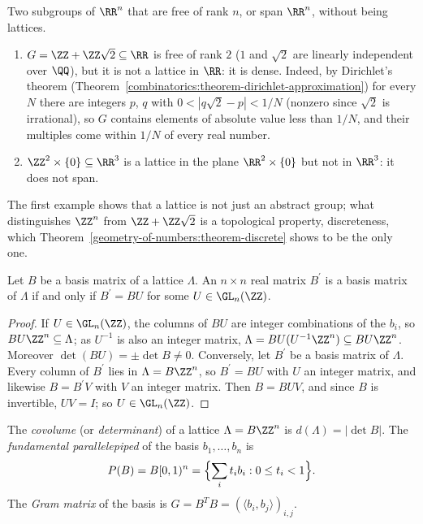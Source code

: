 \begin{counterexample}\label{geometry-of-numbers:counterexample-not-lattice}
Two subgroups of $\RR^n$ that are free of rank $n$, or span $\RR^n$, without being lattices.
\begin{enumerate}
\item $G = \ZZ + \ZZ\sqrt2 \subseteq \RR$ is free of rank $2$ ($1$ and $\sqrt2$ are linearly independent over $\QQ$), but it is not a lattice in $\RR$: it is dense. Indeed, by Dirichlet's
theorem (Theorem~\ref{combinatorics:theorem-dirichlet-approximation}) for every $N$ there are integers $p$, $q$ with $0 < |q\sqrt2 - p| < 1/N$ (nonzero since $\sqrt2$ is irrational), so $G$ contains
elements of absolute value less than $1/N$, and their multiples come within $1/N$ of every real number.
\item $\ZZ^2 \times \{0\} \subseteq \RR^3$ is a lattice in the plane $\RR^2 \times \{0\}$ but not in $\RR^3$: it does not span.
\end{enumerate}
The first example shows that a lattice is not just an abstract group; what distinguishes $\ZZ^n$ from $\ZZ + \ZZ\sqrt2$ is a topological property, discreteness, which
Theorem~\ref{geometry-of-numbers:theorem-discrete} shows to be the only one.
\end{counterexample}

\begin{proposition}\label{geometry-of-numbers:proposition-change-of-basis}
Let $B$ be a basis matrix of a lattice $\Lambda$. An $n \times n$ real matrix $B^{\prime}$ is a basis matrix of $\Lambda$ if and only if $B^{\prime} = BU$ for some $U \in \GL_n(\ZZ)$.
\end{proposition}

\begin{proof}
If $U \in \GL_n(\ZZ)$, the columns of $BU$ are integer combinations of the $b_i$, so $BU\ZZ^n \subseteq \Lambda$; as $U^{-1}$ is also an integer matrix, $\Lambda = BU(U^{-1}\ZZ^n) \subseteq BU\ZZ^n$.
Moreover $\det(BU) = \pm\det B \neq 0$. Conversely, let $B^{\prime}$ be a basis matrix of $\Lambda$. Every column of $B^{\prime}$ lies in $\Lambda = B\ZZ^n$, so $B^{\prime} = BU$ with $U$ an integer
matrix, and likewise $B = B^{\prime}V$ with $V$ an integer matrix. Then $B = BUV$, and since $B$ is invertible, $UV = I$; so $U \in \GL_n(\ZZ)$.
\end{proof}

\begin{definition}\label{geometry-of-numbers:definition-covolume}
The \emph{covolume} (or \emph{determinant}) of a lattice $\Lambda = B\ZZ^n$ is $d(\Lambda) = |\det B|$. The \emph{fundamental parallelepiped} of the basis $b_1, \ldots, b_n$ is
\[
P(B) = B[0, 1)^n = \Bigl\{\sum_it_ib_i : 0 \leq t_i < 1\Bigr\}.
\]
The \emph{Gram matrix} of the basis is $G = B^TB = (\langle b_i, b_j \rangle)_{i,j}$.
\end{definition}

